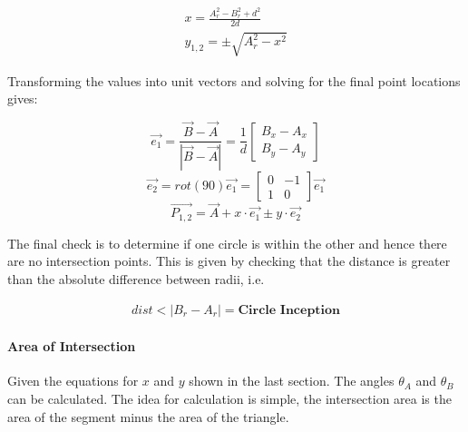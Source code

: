 \documentclass[11pt,twoside]{report}
\begin{document}
\begin{equation}
\begin{aligned}
x = \frac{A_{r}^{2} - B_{r}^{2} + d^{2}}{2d} \\
y_{1,2} = \pm \sqrt{A_{r}^{2} - x^{2}}
\end{aligned}
\label{inter_point_eq2}
\end{equation}

Transforming the values into unit vectors and solving for the final point locations gives:

\begin{equation}
 \overrightarrow{e_{1}} = \frac{ \overrightarrow{B}- \overrightarrow{A}}{|  \overrightarrow{B} -  \overrightarrow{A} |} 
= 
\frac{1}{d}
\begin{bmatrix}
B_{x} - A_{x} \\
B_{y} - A_{y}
\end{bmatrix} 
\end{equation}
\begin{equation}
\overrightarrow{e_{2}} =
rot(90) \overrightarrow{e_{1}} =
\begin{bmatrix}
0 & -1 \\
1 & 0
\end{bmatrix}
\overrightarrow{e_{1}}
\end{equation}
\begin{equation}
\overrightarrow{P_{1,2}} = \overrightarrow{A}+x \cdot \overrightarrow{e_{1}} \pm y \cdot \overrightarrow{e_{2}}
\label{inter_point_eq3}
\end{equation}

The final check is to determine if one circle is within the other and hence there are no intersection points. This is given by checking that the distance is greater than the absolute difference between radii, i.e.


\begin{equation}
\begin{aligned}
dist < |B_{r} - A_{r}| = \textbf{Circle Inception}
\end{aligned}
\label{circle_inception}
\end{equation}


\paragraph{Area of Intersection}

Given the equations for $x$ and $y$ shown in the last section. The angles $\theta_{A}$ and $\theta_{B}$ can be calculated. The idea for calculation is simple, the intersection area is the area of the segment minus the area of the triangle.
\end{document}
